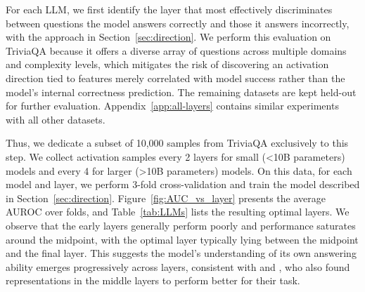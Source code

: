 \documentclass{article} %
\begin{document}
For each LLM, we first identify 
the layer that most effectively discriminates between questions the model answers correctly and those it answers incorrectly, with the approach in Section~\ref{sec:direction}. We perform this evaluation on TriviaQA because it offers a diverse array of questions across multiple domains and complexity levels, which mitigates the risk of discovering an activation direction tied to features merely correlated with model success rather than the model’s internal correctness prediction. The remaining datasets are kept held-out for further evaluation.
Appendix~\ref{app:all-layers} contains similar experiments with all other datasets.

Thus, we dedicate a subset of 10,000 samples from TriviaQA exclusively to this step. We collect activation samples every 2 layers for small (<10B parameters) models and every 4 for larger (>10B parameters) models. On this data, for each model and layer, we perform 3-fold cross-validation and train the model described in Section~\ref{sec:direction}. Figure~\ref{fig:AUC_vs_layer} presents the average AUROC over folds, and Table~\ref{tab:LLMs} lists the resulting optimal layers. We observe that the early layers generally perform poorly and performance saturates around the midpoint, with the optimal layer typically lying between the midpoint and the final layer. %
This suggests the model’s understanding of its own answering ability emerges progressively across layers, consistent with \cite{ferrando2025do}  and \cite{burger2024truth}, who also found representations in the middle layers to perform better for their task.

\end{document}
